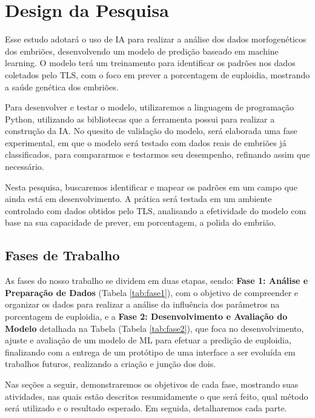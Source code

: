 \section{Design da Pesquisa}

Esse estudo adotará o uso de IA para realizar a análise dos dados morfogenéticos dos embriões, desenvolvendo um modelo de predição baseado em machine learning. O modelo terá um treinamento para identificar os padrões nos dados coletados pelo TLS, com o foco em prever a porcentagem de euploidia, mostrando a saúde genética dos embriões.

Para desenvolver e testar o modelo, utilizaremos a linguagem de programação Python, utilizando as bibliotecas que a ferramenta possui para realizar a construção da IA. No quesito de validação do modelo, será elaborada uma fase experimental, em que o modelo será testado com dados reais de embriões já classificados, para compararmos e testarmos seu desempenho, refinando assim que necessário.

Nesta pesquisa, buscaremos identificar e mapear os padrões em um campo que ainda está em desenvolvimento. A prática será testada em um ambiente controlado com dados obtidos pelo TLS, analisando a efetividade do modelo com base na sua capacidade de prever, em porcentagem, a polida do embrião.

\subsection{Fases de Trabalho}

As fases do nosso trabalho se dividem em duas etapas, sendo: \textbf{Fase 1: Análise e Preparação de Dados} (Tabela \ref{tab:fase1}), com o objetivo de compreender e organizar os dados para realizar a análise da influência dos parâmetros na porcentagem de euploidia, e a \textbf{Fase 2: Desenvolvimento e Avaliação do Modelo} detalhada na Tabela (Tabela \ref{tab:fase2}), que foca no desenvolvimento, ajuste e avaliação de um modelo de ML para efetuar a predição de euploidia, finalizando com a entrega de um protótipo de uma interface a ser evoluída em trabalhos futuros, realizando a criação e junção dos dois.

Nas seções a seguir, demonstraremos os objetivos de cada fase, mostrando suas atividades, nas quais estão descritos resumidamente o que será feito, qual método será utilizado e o resultado esperado. Em seguida, detalharemos cada parte.

